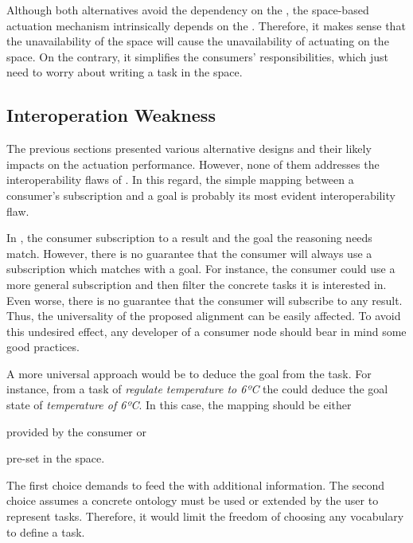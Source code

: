 Although both alternatives avoid the dependency on the \Space{}, the space-based actuation mechanism intrinsically depends on the \Space{}.
Therefore, it makes sense that the unavailability of the space will cause the unavailability of actuating on the space.
On the contrary, it simplifies the consumers' responsibilities, which just need to worry about writing a task in the space.



\subsection{Interoperation Weakness}

The previous sections presented various alternative designs and their likely impacts on the actuation performance.
However, none of them addresses the interoperability flaws of \implMix{}.
In this regard, the simple mapping between a consumer's subscription and a goal is probably its most evident interoperability flaw.


In \implMix{}, the consumer subscription to a result and the goal the reasoning needs match.
However, there is no guarantee that the consumer will always use a subscription which matches with a goal.
For instance, the consumer could use a more general subscription and then filter the concrete tasks it is interested in.
Even worse, there is no guarantee that the consumer will subscribe to any result.
Thus, the universality of the proposed alignment can be easily affected.
To avoid this undesired effect, any developer of a consumer node should bear in mind some good practices. %


A more universal approach would be to deduce the goal from the task. %
For instance, from a task of \emph{regulate temperature to 6ºC} the \Space{} could deduce the goal state of \emph{temperature of 6ºC}.
In this case, the mapping should be either
\begin{enumerate*}[label=\itshape(\arabic*\upshape)]
  \item provided by the consumer or
  \item pre-set in the space.
\end{enumerate*}
The first choice demands to feed the \Space{} with additional information. %
The second choice assumes a concrete ontology must be used or extended by the user to represent tasks.
Therefore, it would limit the freedom of choosing any vocabulary to define a task.


